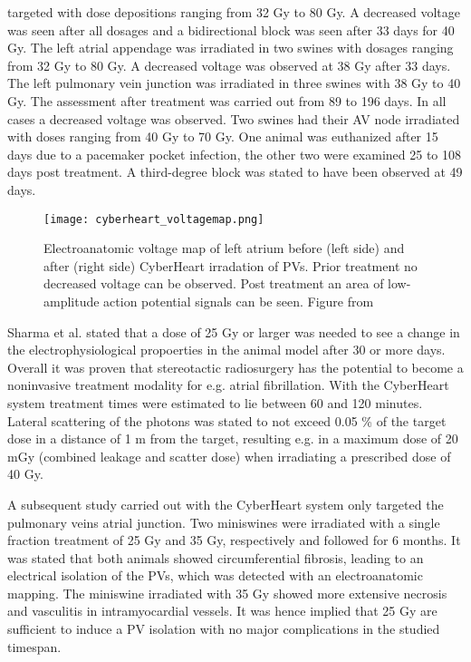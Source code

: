 \documentclass[type=dr, dr=rernat, accentcolor=tud7b,colorbacktitle, bigchapter, openright, twoside, 12pt ]{tudthesis}
\begin{document}
targeted with dose depositions ranging from 32 Gy to 80 Gy. A decreased voltage was seen after all dosages and a bidirectional block 
was seen after 33 days for 40 Gy. The left atrial appendage was irradiated in two swines with dosages ranging from 32 Gy to 80 Gy. A 
decreased voltage was observed at 38 Gy after 33 days. The left pulmonary vein junction was irradiated in three swines with 38 Gy to 40 Gy. 
The assessment after treatment was carried out from 89 to 196 days. In all cases a decreased voltage was observed. Two swines had their 
AV node irradiated with doses ranging from 40 Gy to 70 Gy. One animal was euthanized after 15 days due to a pacemaker pocket infection,
the other two were examined 25 to 108 days post treatment. A third-degree block was stated to have been observed at 49 days. 

\begin{figure}[H]
\begin{center}
\texttt{[image: cyberheart\_voltagemap.png]}
\caption{Electroanatomic voltage map of left atrium before (left side) and after (right side) CyberHeart irradation of PVs. Prior treatment 
no decreased voltage can be observed. Post treatment an area of low-amplitude action potential signals can be seen. Figure from \cite{Sha10}}
\end{center}
\end{figure}

Sharma et al. stated that a dose of 25 Gy or larger was needed to see a change in the electrophysiological propoerties in the animal model 
after 30 or more days. Overall it was proven that stereotactic radiosurgery has the potential to 
become a noninvasive treatment modality for e.g. atrial fibrillation. With the CyberHeart system  treatment times were estimated to lie 
between 60 and 120 minutes. Lateral scattering of the photons was stated to not exceed 0.05 \% of the target dose in a distance of 1 m 
from the target, resulting e.g. in a maximum dose of 20 mGy (combined leakage and scatter dose) when irradiating a prescribed dose 
of 40 Gy. \newline

A subsequent study carried out with the CyberHeart system \cite{Mag11} only targeted the pulmonary veins atrial junction. Two miniswines 
were irradiated with a single fraction treatment of 25 Gy and 35 Gy, respectively and followed for 6 months. It was stated that both animals 
showed circumferential fibrosis, leading to an electrical isolation of the PVs, which was detected with an electroanatomic mapping. 
The miniswine irradiated with 35 Gy showed more extensive necrosis and vasculitis in intramyocardial vessels. It was hence implied that 
25 Gy are sufficient to induce a PV isolation with no major complications in the studied timespan. \newline
\end{document}
